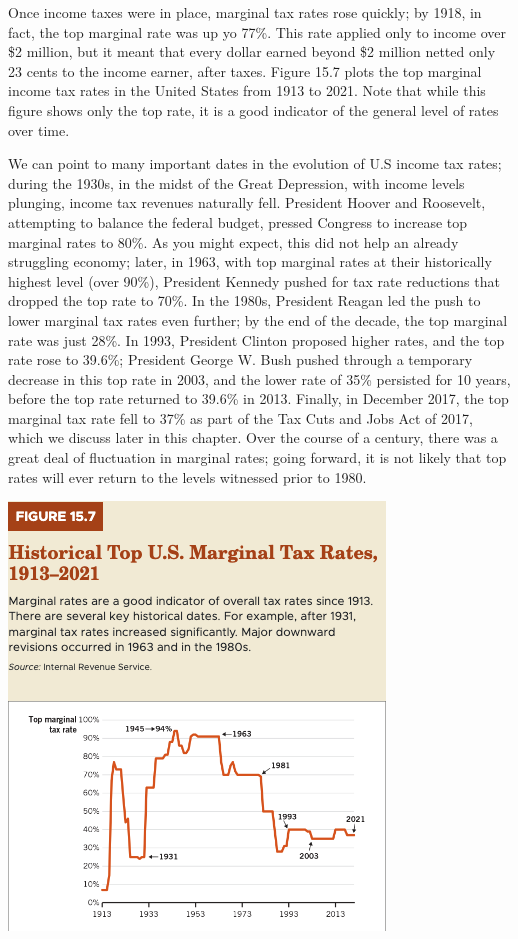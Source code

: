 \documentclass[11pt]{article} %
\begin{document}
Once income taxes were in place, marginal tax rates rose quickly; by 1918, in fact, the top marginal rate was up yo 77\%. This rate applied only to income over \$2 million, but it meant that every dollar earned beyond \$2 million netted only 23 cents to the income earner, after taxes. Figure 15.7 plots the top marginal income tax rates in the United States from 1913 to 2021. Note that while this figure shows only the top rate, it is a good indicator of the general level of rates over time.

We can point to many important dates in the evolution of U.S income tax rates; during the 1930s, in the midst of the Great Depression, with income levels plunging, income tax revenues naturally fell. President Hoover and Roosevelt, attempting to balance the federal budget, pressed Congress to increase top marginal rates to 80\%. As you might expect, this did not help an already struggling economy; later, in 1963, with top marginal rates at their historically highest level (over 90\%), President Kennedy pushed for tax rate reductions that dropped the top rate to 70\%. In the 1980s, President Reagan led the push to lower marginal tax rates even further; by the end of the decade, the top marginal rate was just 28\%. In 1993, President Clinton proposed higher rates, and the top rate rose to 39.6\%; President George W. Bush pushed through a temporary decrease in this top rate in 2003, and the lower rate of 35\% persisted for 10 years, before the top rate returned to 39.6\% in 2013. Finally, in December 2017, the top marginal tax rate fell to 37\% as part of the Tax Cuts and Jobs Act of 2017, which we discuss later in this chapter. Over the course of a century, there was a great deal of fluctuation in marginal rates; going forward, it is not likely that top rates will ever return to the levels witnessed prior to 1980.

\begin{center}
\includegraphics[scale=0.5]{images/Figure 15.7.png}
\end{center}
\end{document}
